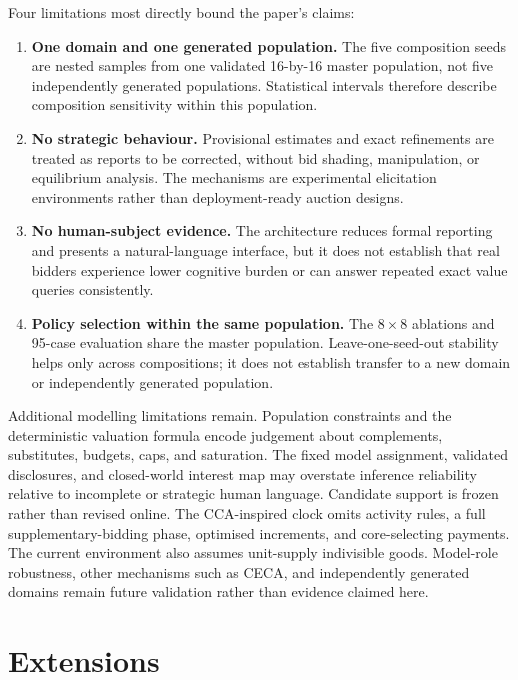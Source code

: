 Four limitations most directly bound the paper's claims:
\begin{enumerate}[leftmargin=*]
    \item \textbf{One domain and one generated population.} The five
    composition seeds are nested samples from one validated 16-by-16 master
    population, not five independently generated populations. Statistical
    intervals therefore describe composition sensitivity within this
    population.
    \item \textbf{No strategic behaviour.} Provisional estimates and exact
    refinements are treated as reports to be corrected, without bid shading,
    manipulation, or equilibrium analysis. The mechanisms are experimental
    elicitation environments rather than deployment-ready auction designs.
    \item \textbf{No human-subject evidence.} The architecture reduces formal
    reporting and presents a natural-language interface, but it does not
    establish that real bidders experience lower cognitive burden or can
    answer repeated exact value queries consistently.
    \item \textbf{Policy selection within the same population.} The
    \(8\times8\) ablations and 95-case evaluation share the master population.
    Leave-one-seed-out stability helps only across compositions; it does not
    establish transfer to a new domain or independently generated population.
\end{enumerate}

Additional modelling limitations remain. Population constraints and the
deterministic valuation formula encode judgement about complements,
substitutes, budgets, caps, and saturation. The fixed model assignment,
validated disclosures, and closed-world interest map may overstate inference
reliability relative to incomplete or strategic human language. Candidate
support is frozen rather than revised online. The CCA-inspired clock omits
activity rules, a full supplementary-bidding phase, optimised increments, and
core-selecting payments. The current environment also assumes unit-supply
indivisible goods. Model-role robustness, other mechanisms such as CECA, and
independently generated domains remain future validation rather than evidence
claimed here.

\section{Extensions}

